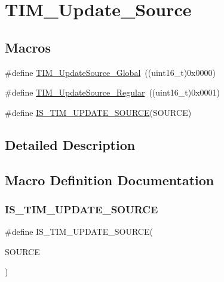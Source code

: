 \hypertarget{group___t_i_m___update___source}{}\section{T\+I\+M\+\_\+\+Update\+\_\+\+Source}
\label{group___t_i_m___update___source}
\subsection*{Macros}
\begin{DoxyCompactItemize}
\item 
\#define \mbox{\hyperlink{group___t_i_m___update___source_ga32c67bc3f8211a2c7b44ee9fe1523875}{T\+I\+M\+\_\+\+Update\+Source\+\_\+\+Global}}~((uint16\+\_\+t)0x0000)
\item 
\#define \mbox{\hyperlink{group___t_i_m___update___source_ga6f50423cdb011137ae8cd303ccd2080c}{T\+I\+M\+\_\+\+Update\+Source\+\_\+\+Regular}}~((uint16\+\_\+t)0x0001)
\item 
\#define \mbox{\hyperlink{group___t_i_m___update___source_ga7c916798d8f5f4a828afadceb5d38a95}{I\+S\+\_\+\+T\+I\+M\+\_\+\+U\+P\+D\+A\+T\+E\+\_\+\+S\+O\+U\+R\+CE}}(S\+O\+U\+R\+CE)
\end{DoxyCompactItemize}


\subsection{Detailed Description}


\subsection{Macro Definition Documentation}
\mbox{\label{group___t_i_m___update___source_ga7c916798d8f5f4a828afadceb5d38a95}} 
\subsubsection{\texorpdfstring{IS\_TIM\_UPDATE\_SOURCE}{IS\_TIM\_UPDATE\_SOURCE}}
{\footnotesize\ttfamily \#define I\+S\+\_\+\+T\+I\+M\+\_\+\+U\+P\+D\+A\+T\+E\+\_\+\+S\+O\+U\+R\+CE(\begin{DoxyParamCaption}\item[{}]{S\+O\+U\+R\+CE }\end{DoxyParamCaption})}

